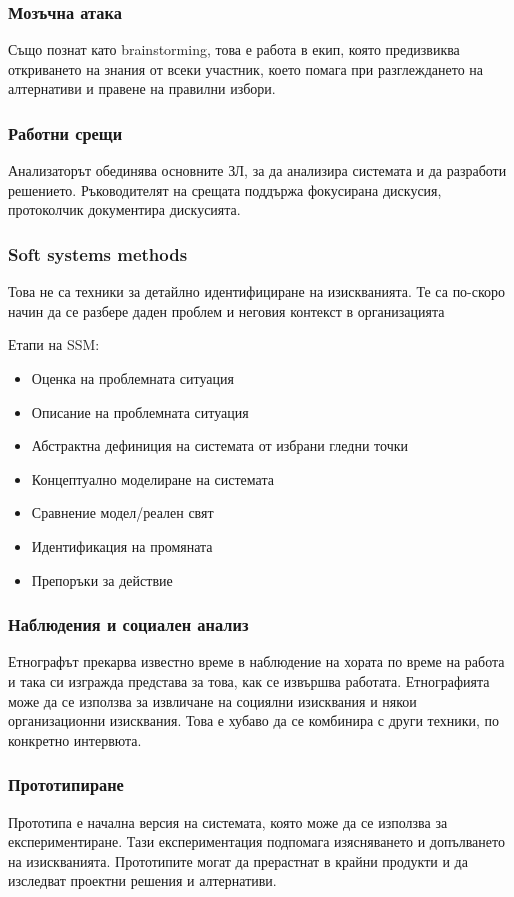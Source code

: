 \documentclass[fleqn,12pt]{article}
\begin{document}
\subsubsection{Мозъчна атака}
Също познат като brainstorming, това е работа в екип, която предизвиква откриването на знания от всеки участник, което помага при разглеждането на алтернативи и правене на правилни избори.

\subsubsection{Работни срещи}
Анализаторът обединява основните ЗЛ, за да анализира системата и да разработи решението. Ръководителят на срещата поддържа фокусирана дискусия, протоколчик документира дискусията.

\subsubsection{Soft systems methods}
Това не са техники за детайлно идентифициране на изискванията. Те са по-скоро начин да се разбере даден проблем и неговия контекст в организацията

 Етапи на SSM:
\begin{itemize}
	\item Оценка на проблемната ситуация
	\item Описание на проблемната ситуация
	\item Абстрактна дефиниция на системата от избрани гледни точки
	\item Концептуално моделиране на системата
	\item Сравнение модел/реален свят
	\item Идентификация на промяната
	\item Препоръки за действие
\end{itemize}

\subsubsection{Наблюдения и социален анализ}
Етнографът прекарва известно време в наблюдение на хората по време на работа и така си изгражда представа за това, как се извършва работата. Етнографията може да се използва за извличане на социялни изисквания и някои организационни изисквания. Това е хубаво да се комбинира с други техники, по конкретно интервюта.

\subsubsection{Прототипиране}
Прототипа е начална версия на системата, която може да се използва за експериментиране. Тази експериментация подпомага изясняването и допълването на изискванията. Прототипите могат да прерастнат в крайни продукти и да изследват проектни решения и алтернативи.
\end{document}
